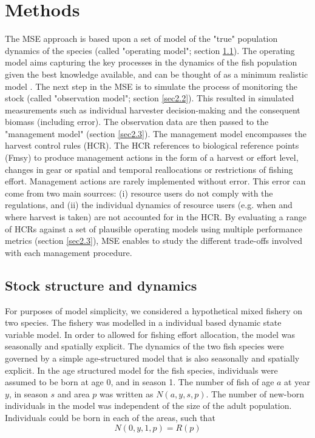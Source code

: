 \documentclass[12pt,oneline,a4paper,numbib]{ouparticle}
\numberwithin{equation}{subsection} %
\begin{document}
\section{Methods}
\label{sec2}
The MSE approach is based upon a set of model of the "true" population dynamics of the species (called "operating model"; section \ref{sec2.1}). The operating model aims capturing the key processes in the dynamics of the fish population given the best knowledge available, and can be thought of as a minimum realistic model \cite{Punt1995}. The next step in the MSE is to simulate the process of monitoring the stock (called "observation model"; section \ref{sec2.2}). This resulted in simulated measurements such as individual harvester decision-making and the consequent biomass (including error). The observation data are then passed to the "management model" (section \ref{sec2.3}). The management model encompasses the harvest control rules (HCR). The HCR references to biological reference points (Fmsy) to produce management actions in the form of a harvest or effort level, changes in gear or spatial and temporal reallocations or restrictions of fishing effort. Management actions are rarely implemented without error. This error can come from two main sourrces: (i) resource users do not comply with the regulations, and (ii) the individual dynamics of resource users (e.g. when and where harvest is taken) are not accounted for in the HCR. By evaluating a range of HCRs against a set of plausible operating models using multiple performance metrics (section \ref{sec2.3}), MSE enables to study the different trade-offs involved with each management procedure.  
 
\subsection{Stock structure and dynamics}
\label{sec2.1}

For purposes of model simplicity, we considered a hypothetical mixed fishery on two species. The fishery was modelled in a individual based dynamic state variable model. In order to allowed for fishing effort allocation, the model was seasonally and spatially explicit. The dynamics of the two fish species were governed by a simple age-structured model that is also seasonally and spatially explicit. In the age structured model for the fish species, individuals were assumed to be born at age 0, and in season 1. The number of fish of age $a$ at year $y$, in season $s$ and area $p$ was written as $N (a, y, s, p)$. The number of new-born individuals in the model was independent of the size of the adult population. Individuals could be born in each of the areas, such that  
\begin{equation}
N (0, y, 1, p) = R (p)
\end{equation}
\end{document}
